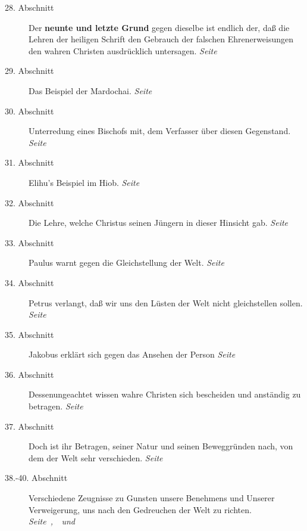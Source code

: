 \begin{description}
\item[28. Abschnitt] Der \textbf{neunte und letzte Grund} gegen dieselbe ist
endlich der,
daß die Lehren der heiligen Schrift den Gebrauch der falschen Ehrenerweisungen
den wahren Christen ausdrücklich untersagen.
\dotfill \textit{Seite~\pageref{kap9_ab28}}\\
\item[29. Abschnitt] Das Beispiel der Mardochai.
\dotfill \textit{Seite~\pageref{kap9_ab29}}\\
\item[30. Abschnitt] Unterredung eines Bischofs mit, dem Verfasser über diesen
Gegenstand.
\dotfill \textit{Seite~\pageref{kap9_ab30}}\\
\item[31. Abschnitt] Elihu's Beispiel im Hiob.
\dotfill \textit{Seite~\pageref{kap9_ab31}}\\
\item[32. Abschnitt] Die Lehre, welche Christus seinen Jüngern in dieser
Hinsicht gab.
\dotfill \textit{Seite~\pageref{kap9_ab32}}\\
\item[33. Abschnitt] Paulus warnt gegen die Gleichstellung der Welt.
\dotfill \textit{Seite~\pageref{kap9_ab33}}\\
\item[34. Abschnitt] Petrus verlangt, daß wir uns den Lüsten der Welt nicht
gleichstellen sollen.
\dotfill \textit{Seite~\pageref{kap9_ab34}}\\
\item[35. Abschnitt] Jakobus erklärt sich gegen das Ansehen der Person
\dotfill \textit{Seite~\pageref{kap9_ab35}}\\
\item[36. Abschnitt] Dessenungeachtet wissen wahre Christen sich bescheiden und
anständig zu betragen.
\dotfill \textit{Seite~\pageref{kap9_ab36}}\\
\item[37. Abschnitt] Doch ist ihr Betragen, seiner Natur und seinen Beweggründen
nach, von dem der Welt sehr verschieden.
\dotfill \textit{Seite~\pageref{kap9_ab37}}\\
\item[38.-40. Abschnitt] Verschiedene Zeugnisse zu Gunsten unsere Benehmens und
Unserer Verweigerung, uns nach den Gedreuchen der Welt zu richten.
\dotfill \textit{Seite~\pageref{kap9_ab38},~\pageref{kap9_ab39}~und~\pageref{kap9_ab40}}\\

\end{description}

